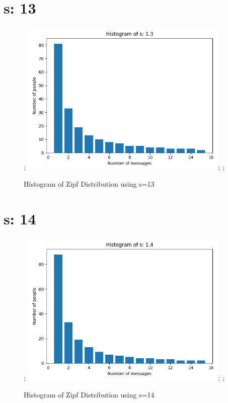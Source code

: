 \documentclass{article}
\begin{document}
\section{s: 13}
\begin{figure}[H] \centering; \includegraphics[width=10cm]{imgs/histogram-13.png}; \label{fig:hist-13}; \caption{Histogram of Zipf Distribution using s=13} \end{figure}




\section{s: 14}
\begin{figure}[H] \centering; \includegraphics[width=10cm]{imgs/histogram-14.png}; \label{fig:hist-14}; \caption{Histogram of Zipf Distribution using s=14} \end{figure}


\end{document}
